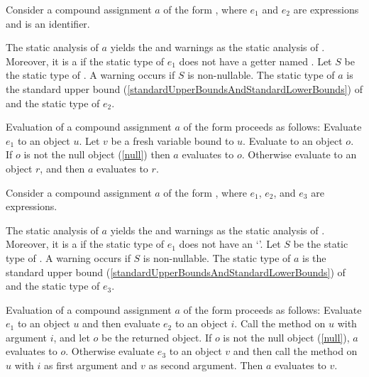 \documentclass[makeidx]{article}
\begin{document}
\LMHash{}%
Consider a compound assignment $a$ of the form ,
where $e_1$ and $e_2$ are expressions and \id{} is an identifier.

\LMHash{}%
The static analysis of $a$ yields
the  and warnings as
the static analysis of .
Moreover, it is a 
if the static type of $e_1$ does not have a getter named \id.
Let $S$ be the static type of .
A warning occurs if $S$ is non-nullable.
The static type of $a$ is the standard upper bound
(\ref{standardUpperBoundsAndStandardLowerBounds})
of  and the static type of $e_2$.

\LMHash{}%
Evaluation of a compound assignment $a$ of the form 
proceeds as follows:
Evaluate $e_1$ to an object $u$.
Let $v$ be a fresh variable bound to $u$.
Evaluate  to an object $o$.
If $o$ is not the null object (\ref{null}) then $a$ evaluates to $o$.
Otherwise evaluate  to an object $r$,
and then $a$ evaluates to $r$.
\EndCase

\LMHash{}%
Consider a compound assignment $a$ of the form ,
where $e_1$, $e_2$, and $e_3$ are expressions.

\LMHash{}%
The static analysis of $a$ yields
the  and warnings as
the static analysis of .
Moreover, it is a 
if the static type of $e_1$ does not have an `'.
Let $S$ be the static type of .
A warning occurs if $S$ is non-nullable.
The static type of $a$ is the standard upper bound
(\ref{standardUpperBoundsAndStandardLowerBounds})
of  and the static type of $e_3$.

\LMHash{}%
Evaluation of a compound assignment $a$ of the form
proceeds as follows:
Evaluate $e_1$ to an object $u$ and then evaluate $e_2$ to an object $i$.
Call the \code{[]} method on $u$ with argument $i$,
and let $o$ be the returned object.
If $o$ is not the null object (\ref{null}), $a$ evaluates to $o$.
Otherwise evaluate $e_3$ to an object $v$
and then call the \code{[]=} method on $u$
with $i$ as first argument and $v$ as second argument.
Then $a$ evaluates to $v$.
\EndCase
\end{document}
